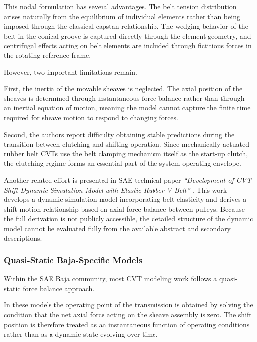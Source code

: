 \documentclass[11pt]{article}
\numberwithin{equation}{section}
\begin{document}
This nodal formulation has several advantages. The belt tension
distribution arises naturally from the equilibrium of individual
elements rather than being imposed through the classical capstan
relationship. The wedging behavior of the belt in the conical groove
is captured directly through the element geometry, and centrifugal
effects acting on belt elements are included through fictitious
forces in the rotating reference frame.

However, two important limitations remain.

First, the inertia of the movable sheaves is neglected. The axial
position of the sheaves is determined through instantaneous force
balance rather than through an inertial equation of motion, meaning
the model cannot capture the finite time required for sheave motion
to respond to changing forces.

Second, the authors report difficulty obtaining stable predictions
during the transition between clutching and shifting operation.
Since mechanically actuated rubber belt CVTs use the belt clamping
mechanism itself as the start-up clutch, the clutching regime forms
an essential part of the system operating envelope.

Another related effort is presented in SAE technical paper
\emph{``Development of CVT Shift Dynamic Simulation Model with Elastic
Rubber V-Belt''} \cite{SAE2011}. This work develops a dynamic simulation
model incorporating belt elasticity and derives a shift motion
relationship based on axial force balance between pulleys. Because
the full derivation is not publicly accessible, the detailed structure
of the dynamic model cannot be evaluated fully from the available
abstract and secondary descriptions.

\subsubsection{Quasi-Static Baja-Specific Models}

Within the SAE Baja community, most CVT modeling work follows a
quasi-static force balance approach.

In these models the operating point of the transmission is obtained
by solving the condition that the net axial force acting on the
sheave assembly is zero. The shift position is therefore treated as
an instantaneous function of operating conditions rather than as a
dynamic state evolving over time.
\end{document}
